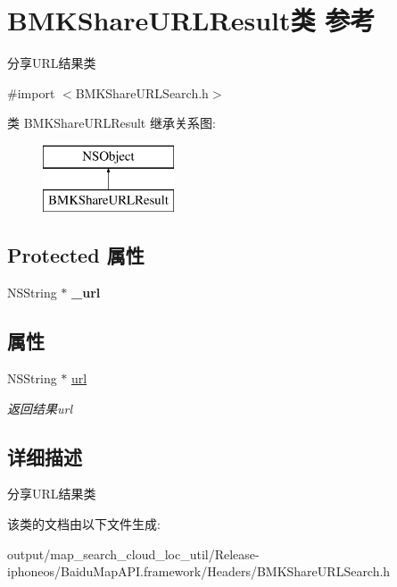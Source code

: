 \hypertarget{interface_b_m_k_share_u_r_l_result}{}\section{B\+M\+K\+Share\+U\+R\+L\+Result类 参考}
\label{interface_b_m_k_share_u_r_l_result}


分享\+U\+R\+L结果类  




{\ttfamily \#import $<$B\+M\+K\+Share\+U\+R\+L\+Search.\+h$>$}

类 B\+M\+K\+Share\+U\+R\+L\+Result 继承关系图\+:\begin{figure}[H]
\begin{center}
\leavevmode
\includegraphics[height=2.000000cm]{interface_b_m_k_share_u_r_l_result}
\end{center}
\end{figure}
\subsection*{Protected 属性}
\begin{DoxyCompactItemize}
\item 
\hypertarget{interface_b_m_k_share_u_r_l_result_ae6060f2c0da5559f27d001b81b703149}{}N\+S\+String $\ast$ {\bfseries \+\_\+url}\label{interface_b_m_k_share_u_r_l_result_ae6060f2c0da5559f27d001b81b703149}

\end{DoxyCompactItemize}
\subsection*{属性}
\begin{DoxyCompactItemize}
\item 
\hypertarget{interface_b_m_k_share_u_r_l_result_aab32f03a7af14ad74e61dcc24e4c9554}{}N\+S\+String $\ast$ \hyperlink{interface_b_m_k_share_u_r_l_result_aab32f03a7af14ad74e61dcc24e4c9554}{url}\label{interface_b_m_k_share_u_r_l_result_aab32f03a7af14ad74e61dcc24e4c9554}

\begin{DoxyCompactList}\small\item\em 返回结果url \end{DoxyCompactList}\end{DoxyCompactItemize}


\subsection{详细描述}
分享\+U\+R\+L结果类 

该类的文档由以下文件生成\+:\begin{DoxyCompactItemize}
\item 
output/map\+\_\+search\+\_\+cloud\+\_\+loc\+\_\+util/\+Release-\/iphoneos/\+Baidu\+Map\+A\+P\+I.\+framework/\+Headers/B\+M\+K\+Share\+U\+R\+L\+Search.\+h\end{DoxyCompactItemize}
